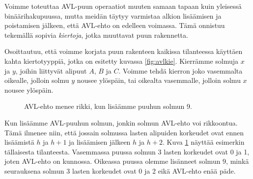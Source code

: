 Voimme toteuttaa AVL-puun operaatiot muuten samaan tapaan
kuin yleisessä binäärihakupuussa, mutta meidän täytyy varmistaa
alkion lisäämisen ja poistamisen jälkeen, että AVL-ehto
on edelleen voimassa.
Tämä onnistuu tekemällä sopivia \emph{kiertoja},
jotka muuttavat puun rakennetta.

Osoittautuu, että voimme korjata puun rakenteen kaikissa
tilanteessa käyttäen kahta kiertotyyppiä,
jotka on esitetty kuvassa \ref{fig:avlkie}.
Kierrämme solmuja $x$ ja $y$,
joihin liittyvät alipuut $A$, $B$ ja $C$.
Voimme tehdä kierron joko vasemmalta oikealle,
jolloin solmu $y$ nousee ylöspäin,
tai oikealta vasemmalle,
jolloin solmu $x$ nousee ylöspäin.

\begin{figure}
\center
{}
\caption{AVL-ehto menee rikki, kun lisäämme puuhun solmun 9.}
\label{fig:avlrik}
\end{figure}

Kun lisäämme AVL-puuhun solmun, jonkin solmun AVL-ehto
voi rikkoontua. Tämä ilmenee niin,
että jossain solmussa lasten alipuiden korkeudet ovat ennen lisäämistä
$h$ ja $h+1$ ja lisäämisen jälkeen $h$ ja $h+2$.
Kuva \ref{fig:avlrik} näyttää esimerkin tällaisesta tilanteesta.
Vasemmassa puussa solmun $3$ lasten korkeudet ovat 0 ja 1,
joten AVL-ehto on kunnossa.
Oikeassa puussa olemme lisänneet solmun $9$,
minkä seurauksena solmun $3$ lasten korkeudet ovat 0 ja 2
eikä AVL-ehto enää päde.

